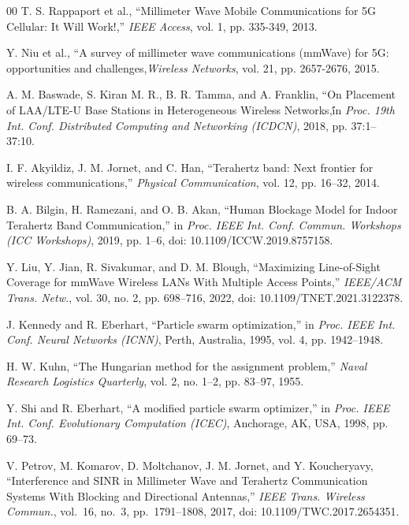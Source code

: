 \documentclass[conference]{IEEEtran}
\begin{document}
	\begin{thebibliography}{00}
		 T. S. Rappaport et al., ``Millimeter Wave Mobile Communications for 5G Cellular: It Will Work!,'' \textit{IEEE Access}, vol. 1, pp. 335-349, 2013.
		
		 Y. Niu et al., ``A survey of millimeter wave communications (mmWave) for 5G: opportunities and challenges,\'\' \textit{Wireless Networks}, vol. 21, pp. 2657-2676, 2015.

	A. M. Baswade, S. Kiran M. R., B. R. Tamma, and A. Franklin,
	``On Placement of LAA/LTE-U Base Stations in Heterogeneous Wireless Networks,\'\' in \textit{Proc. 19th Int. Conf. Distributed Computing and Networking (ICDCN)}, 2018, pp. 37:1--37:10.
		
		
		
		 I. F. Akyildiz, J. M. Jornet, and C. Han, ``Terahertz band: Next frontier for wireless communications,'' \textit{Physical Communication}, vol. 12, pp. 16--32, 2014.
		
		B. A. Bilgin, H. Ramezani, and O. B. Akan,
		``Human Blockage Model for Indoor Terahertz Band Communication,''
		in \textit{Proc. IEEE Int. Conf. Commun. Workshops (ICC Workshops)},
		2019, pp. 1--6, doi: 10.1109/ICCW.2019.8757158.
		
		Y. Liu, Y. Jian, R. Sivakumar, and D. M. Blough,
		``Maximizing Line-of-Sight Coverage for mmWave Wireless LANs With
		Multiple Access Points,'' \textit{IEEE/ACM Trans. Netw.}, vol. 30,
		no. 2, pp. 698--716, 2022, doi: 10.1109/TNET.2021.3122378.
		
		
		
		 J. Kennedy and R. Eberhart, ``Particle swarm optimization,'' in \textit{Proc. IEEE Int. Conf. Neural Networks (ICNN)}, Perth, Australia, 1995, vol. 4, pp. 1942--1948.
		
		 H. W. Kuhn, ``The Hungarian method for the assignment problem,'' \textit{Naval Research Logistics Quarterly}, vol. 2, no. 1--2, pp. 83--97, 1955.
		
		 Y. Shi and R. Eberhart, ``A modified particle swarm optimizer,'' in \textit{Proc. IEEE Int. Conf. Evolutionary Computation (ICEC)}, Anchorage, AK, USA, 1998, pp. 69--73.
		
		V. Petrov, M. Komarov, D. Moltchanov, J. M. Jornet, and
		Y. Koucheryavy, ``Interference and SINR in Millimeter Wave and
		Terahertz Communication Systems With Blocking and Directional
		Antennas,'' \textit{IEEE Trans. Wireless Commun.}, vol.~16, no.~3,
		pp.~1791--1808, 2017, doi: 10.1109/TWC.2017.2654351.
		

\end{thebibliography}
\end{document}
